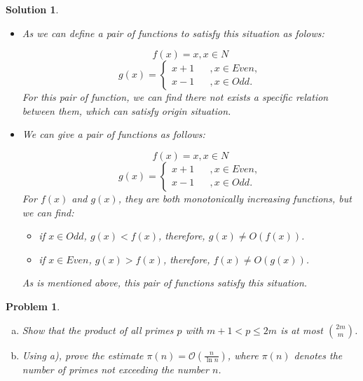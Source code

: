 \documentclass[12pt]{article}
\newtheorem*{solution}{Solution}
\newtheorem{hw}{Problem}
\begin{document}
\begin{solution}\item
    \begin{itemize}
        \item [(1)] As we can define a pair of functions to satisfy this situation as folows:\par
        $$f(x)=x,x \in N$$ 
        $$ g(x)=\left\{
            \begin{array}{rcl}
            x+1       &      & {,x \in Even,}\\
            x-1     &      & {,x \in Odd.}
            \end{array} \right. $$
            For this pair of function, we can find there not exists a specific relation between them, which can satisfy origin situation. 
        \item [(2)] We can give a pair of functions as follows:\par
        $$f(x)=x,x \in N$$ 
        $$ g(x)=\left\{
            \begin{array}{rcl}
            x+1       &      & {,x \in Even,}\\
            x-1     &      & {,x \in Odd.}
            \end{array} \right. $$
        For $f(x)$ and $g(x)$, they are both monotonically increasing functions, but we can find:
        \begin{itemize}
        	\item if $x \in Odd$, $g(x)<f(x)$, therefore, $g(x)\neq O(f(x))$.
        	\item if $x \in Even$, $g(x)>f(x)$, therefore, $f(x)\neq O(g(x))$.
        \end{itemize}
        As is mentioned above, this pair of functions satisfy this situation.
    \end{itemize}
\end{solution}


\begin{hw}
\hspace{1mm}
\begin{enumerate}[a)]
  \item Show that the product of all primes $p$ with $m+1<p\leq 2m$ is at most ${2m\choose m}$.
  \item Using a), prove the estimate $\pi(n)=\mathcal{O}(\frac{n}{\ln n})$, where $\pi(n)$ denotes the number of primes not exceeding the number $n$.
\end{enumerate}
\end{hw}
\end{document}

